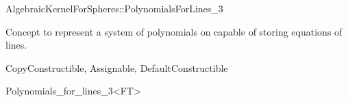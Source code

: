\begin{ccRefConcept}{AlgebraicKernelForSpheres::PolynomialsForLines_3}

\ccDefinition

Concept to represent a system of polynomials on 
capable of storing equations of lines. 

\ccRefines
CopyConstructible, Assignable, DefaultConstructible






\ccHasModels


\ccSeeAlso


\end{ccRefConcept}

\begin{ccRefClass}{Polynomials_for_lines_3<FT>}


\ccIsModel


\ccSeeAlso


\end{ccRefClass}
